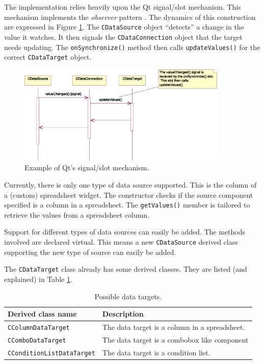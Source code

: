 The implementation relies heavily upon the Qt signal/slot mechanism. This
mechanism implements the \emph{observer} pattern \cite{Gamma}. The dynamics of
this construction are expressed in Figure \ref{fig:design:datadynamics}. The
\verb=CDataSource= object ``detects'' a change in the value it watches. It then
signals the \verb=CDataConnection= object that the target needs updating. The
\verb=onSynchronize()= method then calls \verb=updateValues()= for the correct
\verb=CDataTarget= object.

\begin{figure} \begin{center}
\includegraphics[width=10cm]{./figures/dataconnection_dynamics.eps}
\caption{Example of Qt's signal/slot mechanism.}
\label{fig:design:datadynamics}
\end{center} \end{figure}

Currently, there is only one type of data source supported. This is the column
of a (custom) spreadsheet widget. The constructor checks if the source
component specified is a column in a spreadsheet. The \verb=getValues()= member
is tailored to retrieve the values from a spreadsheet column.

Support for different types of data sources can easily be added. The methods
involved are declared virtual. This means a new \verb=CDataSource= derived
class supporting the new type of source can easily be added.

The \verb=CDataTarget= class already has some derived classes. They are listed
(and explained) in Table \ref{tab:design:datatargets}.

\begin{table} \begin{center}
\caption{Possible data targets.}
\label{tab:design:datatargets}
\begin{tabular}{l|l}
\hline
 \textsf{Derived class name}     & \textsf{Description}                          \\
\hline
 \verb=CColumnDataTarget=        & The data target is a column in a spreadsheet. \\
 \verb=CComboDataTarget=         & The data target is a combobox like component  \\
 \verb=CConditionListDataTarget= & The data target is a condition list.          \\
\hline
\end{tabular}
\end{center} \end{table}

